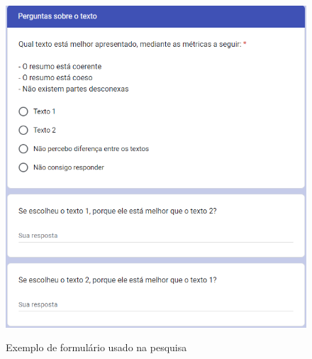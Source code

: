 \label{ap:Forms}

\begin{figure}[h]
    \centering
    \caption{Exemplo de formulário usado na pesquisa}
    \includegraphics[width=\textwidth]{figuras/forms_tcc.png}
    \label{fig:forms_tcc}
\end{figure}